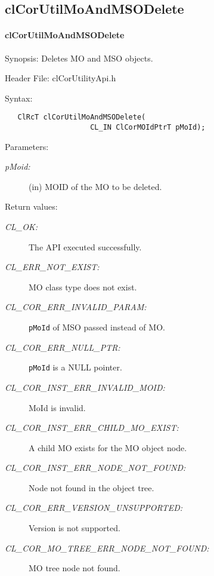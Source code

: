 \begin{flushleft}
\subsection{clCorUtilMoAndMSODelete}
\hypertarget{pagecor104}{}\paragraph{cl\-Cor\-Util\-Mo\-And\-MSO\-Delete}\label{pagecor104}
\begin{Desc}
\item[Synopsis:] Deletes MO and MSO objects.  \end{Desc}
\begin{Desc}
\item[Header File:]clCorUtilityApi.h \end{Desc}
\begin{Desc}
\item[Syntax:]

\footnotesize\begin{verbatim}   ClRcT clCorUtilMoAndMSODelete(
					CL_IN ClCorMOIdPtrT pMoId);

\end{verbatim}
\normalsize
\end{Desc}

\begin{Desc}
\item[Parameters:]
\begin{description}
\item[{\em p\-Moid:}](in) MOID of the MO to be deleted.
\end{description}
\end{Desc}

\begin{Desc}
\item[Return values:]
\begin{description}
\item[{\em CL\_\-OK:}]The API executed successfully. 
\item[{\em CL\_\-ERR\_\-NOT\_\-EXIST:}] MO class type does not exist.
\item[{\em CL\_\-COR\_\-ERR\_\-INVALID\_\-PARAM:}] {\tt{pMoId}} of MSO passed instead of MO.
\item[{\em CL\_\-COR\_\-ERR\_\-NULL\_\-PTR:}]  {\tt{pMoId}} is a NULL pointer.
\item[{\em CL\_\-COR\_\-INST\_\-ERR\_\-INVALID\_\-MOID:}] MoId is invalid.
\item[{\em CL\_\-COR\_\-INST\_\-ERR\_\-CHILD\_\-MO\_\-EXIST:}] A child MO exists for the MO object node.
\item[{\em CL\_\-COR\_\-INST\_\-ERR\_\-NODE\_\-NOT\_\-FOUND:}] Node not found in the object tree.
\item[{\em CL\_\-COR\_\-ERR\_\-VERSION\_\-UNSUPPORTED:}] Version is not supported.
\item[{\em CL\_\-COR\_\-MO\_\-TREE\_\-ERR\_\-NODE\_\-NOT\_\-FOUND:}] MO tree node not found.


\end{description}
\end{Desc}
\end{flushleft}
